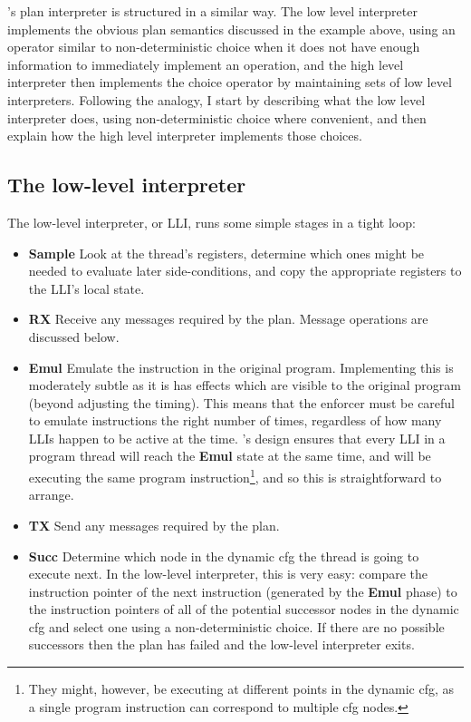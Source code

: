 {\Implementation}'s plan interpreter is structured in a similar way.
The low level interpreter implements the obvious plan semantics
discussed in the example above, using an operator similar to
non-deterministic choice when it does not have enough information to
immediately implement an operation, and the high level interpreter
then implements the choice operator by maintaining sets of low level
interpreters.  Following the analogy, I start by describing what the
low level interpreter does, using non-deterministic choice where
convenient, and then explain how the high level interpreter implements
those choices.

\subsection{The low-level interpreter}
\label{sect:enforce:llis}

The low-level interpreter, or LLI, runs some simple stages in a tight
loop:

\begin{itemize}
\item \textbf{Sample} Look at the thread's registers, determine which
  ones might be needed to evaluate later side-conditions, and copy the
  appropriate registers to the LLI's local state.

\item \textbf{RX} Receive any messages required by the plan.  Message
  operations are discussed below.

\item \textbf{Emul} Emulate the instruction in the original program.
  Implementing this is moderately subtle as it is has effects which
  are visible to the original program (beyond adjusting the timing).
  This means that the enforcer must be careful to emulate instructions
  the right number of times, regardless of how many LLIs happen to be
  active at the time.  {\Technique}'s design ensures that every LLI in
  a program thread will reach the \textbf{Emul} state at the same
  time, and will be executing the same program
  instruction\footnote{They might, however, be executing at different
    points in the dynamic \gls{cfg}, as a single program instruction
    can correspond to multiple \gls{cfg} nodes.}, and so this is
  straightforward to arrange.

\item \textbf{TX} Send any messages required by the plan.

\item \textbf{Succ} Determine which node in the dynamic \gls{cfg} the
  thread is going to execute next.  In the low-level interpreter, this
  is very easy: compare the instruction pointer of the next
  instruction (generated by the \textbf{Emul} phase) to the
  instruction pointers of all of the potential successor nodes in the
  dynamic \gls{cfg} and select one using a non-deterministic choice.
  If there are no possible successors then the plan has failed and the
  low-level interpreter exits.
\end{itemize}

